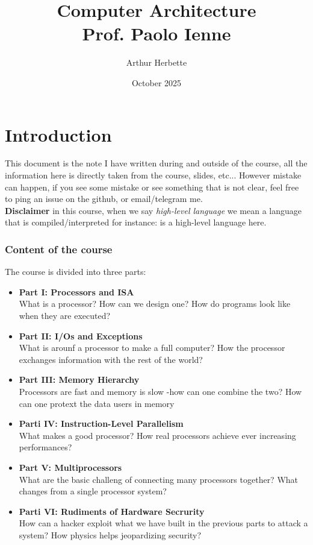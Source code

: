 \documentclass{book}
\title{Computer Architecture \\ Prof. Paolo Ienne}
\author{Arthur Herbette}
\date{October 2025}
\renewcommand{\texttt}[1]{\inlinecode{#1}}
\begin{document}
\maketitle

\newpage
\tableofcontents
\newpage
\chapter{Introduction}
This document is the note I have written during and outside of the course, all the information here is directly taken from the course, slides, etc... However mistake can happen, if you see some mistake or see something that is not clear, feel free to ping an issue on the github, or email/telegram me.\\
\textbf{Disclaimer} in this course, when we say \textit{high-level language} we mean a language that is compiled/interpreted for instance: \texttt{c} is a high-level language here.
\subsection{Content of the course}
The course is divided into three parts:
\begin{itemize}
	\item \textbf{Part I: Processors and ISA}  \\ What is a processor? How can we design one? How do programs look like when they are executed? 
	\item \textbf{Part II: I/Os and Exceptions} \\ What is arounf a processor to make a full computer? How the processor exchanges information with the rest of the world? 
	\item \textbf{Part III: Memory Hierarchy} \\ Processors are fast and memory is slow -how can one combine the two? How can one protext the data users in memory
	\item \textbf{Parti IV: Instruction-Level Parallelism} \\ What makes a good processor? How real processors achieve ever increasing performances? 
	\item \textbf{Part V: Multiprocessors} \\ What are the basic challeng of connecting many processors together? What changes from a single processor system? 
	\item \textbf{Parti VI: Rudiments of Hardware Secrurity} \\ How can a hacker exploit what we have built in the previous parts to attack a system? How physics helps jeopardizing security?
\end{itemize}
\end{document}
